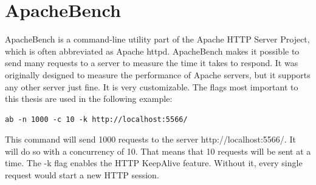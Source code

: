 \section{ApacheBench}
ApacheBench is a command-line utility part of the Apache HTTP Server Project, which is often abbreviated as Apache httpd. ApacheBench makes it possible to send many requests to a server to measure the time it takes to respond. It was originally designed to measure the performance of Apache servers, but it supports any other server just fine. It is very customizable. The flags most important to this thesis are used in the following example:
\begin{lstlisting}[language=no-numbers]
ab -n 1000 -c 10 -k http://localhost:5566/ 
\end{lstlisting}
This command will send 1000 requests to the server http://localhost:5566/. It will do so with a concurrency of 10. That means that 10 requests will be sent at a time. The -k flag enables the HTTP KeepAlive feature. Without it, every single request would start a new HTTP session. \cite{Apache:Bench}


